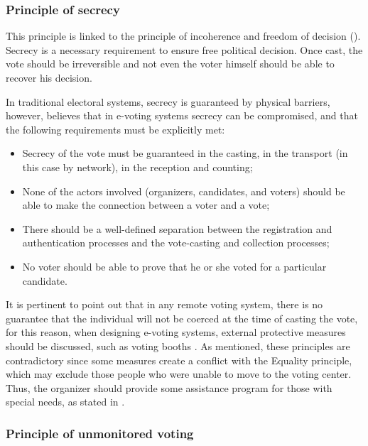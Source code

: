 \documentclass[english]{textolivre}
\begin{document}
\subsubsection{Principle of secrecy \label{sec-Secrecy}}

This principle is linked to the principle of incoherence and freedom of decision (). Secrecy is a necessary requirement to ensure free political decision. Once cast, the vote should be irreversible and not even the voter himself should be able to recover his decision.

In traditional electoral systems, secrecy is guaranteed by physical barriers, however, \textcite{Gritzalis} believes that in e-voting systems secrecy can be compromised, and that the following requirements must be explicitly met:

\begin{itemize}
\item Secrecy of the vote must be guaranteed in the casting, in the transport (in this case by network), in the reception and counting;

\item None of the actors involved (organizers, candidates, and voters) should be able to make the connection between a voter and a vote;

\item There should be a well-defined separation between the registration and authentication processes and the vote-casting and collection processes;

\item No voter should be able to prove that he or she voted for a particular candidate.

\end{itemize}

It is pertinent to point out that in any remote voting system, there is no guarantee that the individual will not be coerced at the time of casting the vote, for this reason, when designing e-voting systems, external protective measures should be discussed, such as voting booths \cite{Gritzalis}. As mentioned, these principles are contradictory since some measures create a conflict with the Equality principle, which may exclude those people who were unable to move to the voting center. Thus, the organizer should provide some assistance program for those with special needs, as stated in .

\subsubsection{Principle of unmonitored voting \label{sec-principle-unmonitored}}
\end{document}
